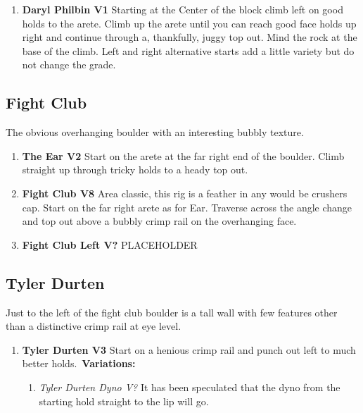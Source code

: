 \begin{enumerate}[]
	\item\label{rt:Daryl Philbin} \colorbox{green!20}{\textbf{Daryl Philbin V1      \warn } }
	\newline Starting at the Center of the block climb left on good holds to the arete. Climb up the arete until you can reach good face holds up right and continue through a, thankfully, juggy top out. Mind the rock at the base of the climb. Left and right alternative starts add a little variety but do not change the grade.\
\end{enumerate}
\subsection*{Fight Club}\label{bf:Fight Club}
The obvious overhanging boulder with an interesting bubbly texture.

\begin{enumerate}[resume]
	\item\label{rt:The Ear} \colorbox{green!20}{\textbf{The Ear V2      } }
	\newline Start on the arete at the far right end of the boulder. Climb straight up through tricky holds to a heady top out.\
	\item\label{rt:Fight Club} \colorbox{Goldenrod!50}{\textbf{Fight Club V8      } }
	\newline Area classic, this rig is a feather in any would be crushers cap. Start on the far right arete as for Ear. Traverse across the angle change and top out above a bubbly crimp rail on the overhanging face.\
	\item\label{rt:Fight Club Left} \colorbox{black!20}{\textbf{Fight Club Left V?  } }
	\newline PLACEHOLDER\
\end{enumerate}
\subsection*{Tyler Durten}\label{bf:Tyler Durten}
Just to the left of the fight club boulder is a tall wall with few features other than a distinctive crimp rail at eye level.

\begin{enumerate}[resume]
	\item\label{rt:Tyler Durten} \colorbox{green!20}{\textbf{Tyler Durten V3   } }
	\newline Start on a henious crimp rail and punch out left to much better holds.\
	\newline \textbf{Variations:}
	\begin{enumerate}
		\item\label{vr:Tyler Durten Dyno} \colorbox{black!20}{\emph{Tyler Durten Dyno V?  }  }
		\newline It has been speculated that the dyno from the starting hold straight to the lip will go.\
	\end{enumerate}
\end{enumerate}
